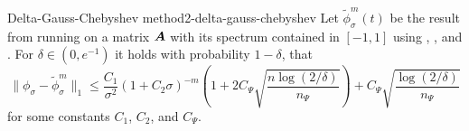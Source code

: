 \begin{theorem}{Delta-Gauss-Chebyshev method}{2-delta-gauss-chebyshev}
    Let $\widetilde{\phi}_{\sigma}^m(t)$ be the result from running 
    on a matrix $\boldsymbol{A}$ with its spectrum contained in $[-1, 1]$ using
    , , and
    . For $\delta \in (0, e^{-1})$ it holds with
    probability $1-\delta$, that
    \begin{equation}
        \lVert \phi_{\sigma} - \widetilde{\phi}_{\sigma}^m\rVert _1
        \leq \frac{C_1}{\sigma^2} (1 + C_2 \sigma)^{-m} \left( 1 + 2 C_{\Psi} \sqrt{\frac{n \log(2/\delta)}{n_{\Psi}}} \right) + C_{\Psi} \sqrt{\frac{\log(2/\delta)}{n_{\Psi}}}
    \end{equation}
    for some constants $C_1$, $C_2$, and $C_{\Psi}$.
\end{theorem}

